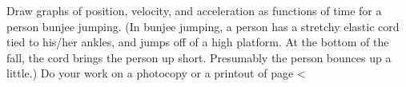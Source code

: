 Draw graphs of position, velocity, and acceleration as
functions of time for a person bunjee jumping. (In bunjee
jumping, a person has a stretchy elastic cord tied to
his/her ankles, and jumps off of a high platform. At the
bottom of the fall, the cord brings the person up short.
Presumably the person bounces up a little.)
Do your work on a photocopy or a printout of 
page <%
